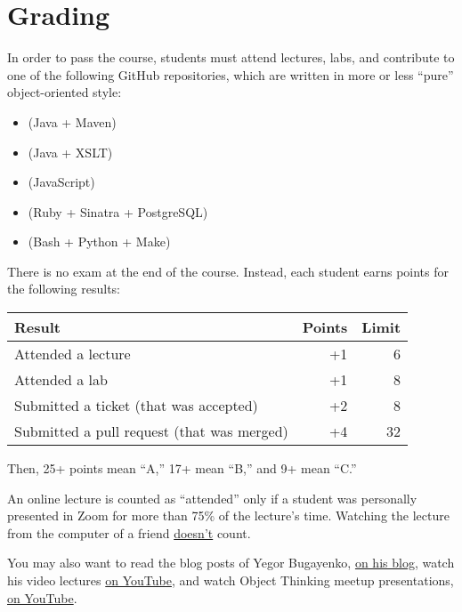 \documentclass[nobrand,anonymous,nodate,nosecurity]{huawei}
\begin{document}
\newpage
\section*{Grading}

In order to pass the course, students must attend lectures, labs, and
contribute to one of the following GitHub repositories, which are written
in more or less ``pure'' object-oriented style:

\begin{itemize}
    \item \href{https://github.com/yegor256/cactoos}{} (Java + Maven)
    \item \href{https://github.com/yegor256/takes}{} (Java + XSLT)
    \item \href{https://github.com/objectionary/eo2js}{} (JavaScript)
    \item \href{https://github.com/zerocracy/baza}{} (Ruby + Sinatra + PostgreSQL)
    \item \href{https://github.com/yegor256/cam}{} (Bash + Python + Make)
\end{itemize}

There is no exam at the end of the course. Instead,
each student earns points for the following results:\\
\renewcommand{\arraystretch}{1}
\begin{tabular}{lrr}
Result & Points & Limit \\
\hline
Attended a lecture & +1 & 6 \\
Attended a lab & +1 & 8 \\
Submitted a ticket (that was accepted) & +2 & 8 \\
Submitted a pull request (that was merged) & +4 & 32 \\
\end{tabular}

Then, 25+ points mean ``A,'' 17+ mean ``B,'' and 9+ mean ``C.''

An online lecture is counted as ``attended'' only if a student was personally
presented in Zoom for more than 75\% of the lecture's time. Watching the
lecture from the computer of a friend \ul{doesn't} count.

\newpage
\renewcommand\refname{Learning Materials}
\printbibliography

You may also want to read the blog posts of Yegor Bugayenko, \href{https://www.yegor256.com/tag/oop}{on his blog},
watch his video lectures \href{https://www.youtube.com/playlist?list=PLaIsQH4uc08yw2CsNv5OV30GfKE6XVGii}{on YouTube},
and watch Object Thinking meetup presentations, \href{https://www.youtube.com/watch?v=yT6oO28wEik&list=PLaIsQH4uc08yetzX86w1pPck1QtGEy_ik}{on YouTube}.
\end{document}

